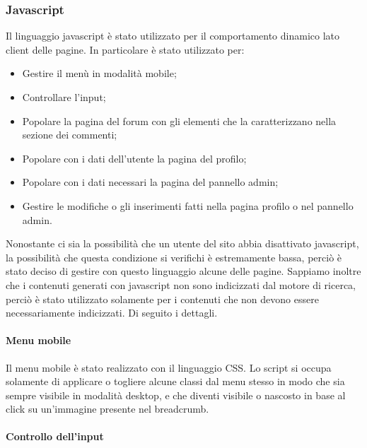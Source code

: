 \subsubsection{Javascript}\label{subs:js}

Il linguaggio javascript è stato utilizzato per il comportamento dinamico lato client delle pagine. In particolare è stato utilizzato per: 

\begin{itemize}
    
	\item Gestire il menù in modalità mobile;
    \item Controllare l'input;
	\item Popolare la pagina del forum con gli elementi che la caratterizzano nella sezione dei commenti;
	\item Popolare con i dati dell'utente la pagina del profilo;
	\item Popolare con i dati necessari la pagina del pannello admin;
	\item Gestire le modifiche o gli inserimenti fatti nella pagina profilo o nel pannello admin.
\end{itemize}

Nonostante ci sia la possibilità che un utente del sito abbia disattivato javascript, la possibilità che questa condizione si verifichi è estremamente bassa, perciò è stato deciso di gestire con questo linguaggio alcune delle pagine. 
Sappiamo inoltre che i contenuti generati con javascript non sono indicizzati dal motore di ricerca, perciò è stato utilizzato solamente per i contenuti che non devono essere necessariamente indicizzati. Di seguito i dettagli.

\paragraph{Menu mobile} %

Il menu mobile è stato realizzato con il linguaggio CSS. Lo script si occupa solamente di applicare o togliere alcune classi dal menu stesso in modo che sia sempre visibile in modalità desktop, e che diventi visibile o nascosto in base al click su un'immagine 
presente nel breadcrumb.

\paragraph{Controllo dell'input}

